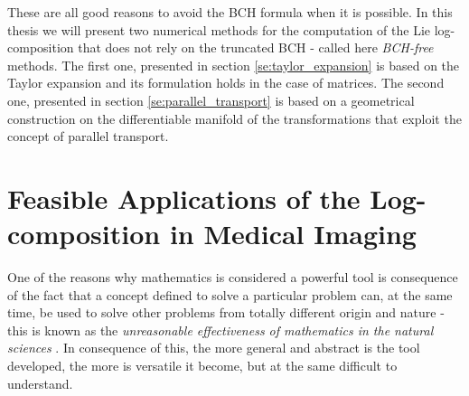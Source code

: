 These are all good reasons to avoid the BCH formula when it is possible. In this thesis we will present two numerical methods for the computation of the Lie log-composition that does not rely on the truncated BCH - called here \emph{BCH-free} methods. The first one, presented in section \ref{se:taylor_expansion} is based on the Taylor expansion and its formulation holds in the case of matrices. The second one, presented in section \ref{se:parallel_transport} is based on a geometrical construction on the differentiable manifold of the transformations that exploit the concept of parallel transport. 
%





\section{Feasible Applications of the Log-composition in Medical Imaging}\label{se:applications_log_com_in_med}
One of the reasons why mathematics is considered a powerful tool is consequence of the fact that a concept defined to solve a particular problem can, at the same time, be used to solve other problems from totally different origin and nature - this is known as the \emph{unreasonable effectiveness of mathematics in the natural sciences} \cite{wigner1960unreasonable}. In consequence of this, the more general and abstract is the tool developed, the more is versatile it become, but at the same difficult to understand.


